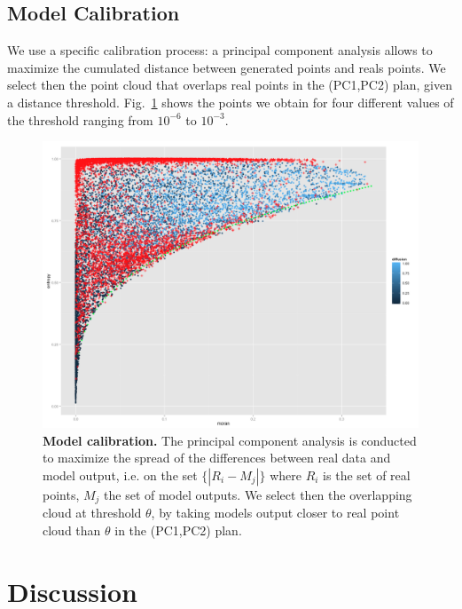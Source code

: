 \documentclass[10pt,letterpaper,draft]{article}
\begin{document}
\subsection*{Model Calibration}



We use a specific calibration process: a principal component analysis allows to maximize the cumulated distance between generated points and reals points. We select then the point cloud that overlaps real points in the (PC1,PC2) plan, given a distance threshold. Fig.~\ref{fig:densitycalib} shows the points we obtain for four different values of the threshold ranging from $10^{-6}$ to $10^{-3}$.




\begin{figure}
\includegraphics[width=\textwidth]{figures/Fig5.png}
\caption{\textbf{Model calibration.} The principal component analysis is conducted to maximize the spread of the differences between real data and model output, i.e. on the set $\{\left|R_i - M_j\right|\}$ where $R_i$ is the set of real points, $M_j$ the set of model outputs. We select then the overlapping cloud at threshold $\theta$, by taking models output closer to real point cloud than $\theta$ in the (PC1,PC2) plan.}
\label{fig:densitycalib}
\end{figure}







\section*{Discussion}
\end{document}
